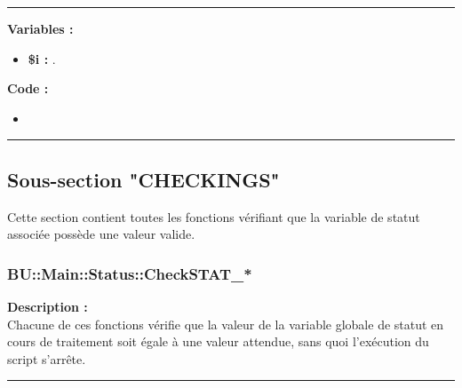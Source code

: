\documentclass[a4paper,10pt]{article}
\begin{document}
\par\noindent\rule{\textwidth}{0.4pt}

\begin{justify}\setlength{\parskip}{1em}
    \textbf{Variables :}

    \begin{itemize}
        \item \textbf{\color{orange}\$i\color{white} :} .
    \end{itemize}
\end{justify}

\begin{justify}
    \textbf{Code :}
    \begin{itemize}
        \item 
    \end{itemize}

\end{justify}



\color{green}\par\noindent\rule{\textwidth}{0.4pt}\color{white}

\color{green}
\subsection{Sous-section "CHECKINGS"}\color{white}

\begin{justify}
    Cette section contient toutes les fonctions vérifiant que la variable de statut associée possède une valeur valide.
\end{justify}

\color{blue}
\subsubsection{BU::Main::Status::CheckSTAT\_*}\color{white}

\begin{justify}
    \textbf{Description :}\\[1\baselineskip]
    Chacune de ces fonctions vérifie que la valeur de la variable globale de statut en cours de traitement soit égale à une valeur attendue, sans quoi l'exécution du script s'arrête.
\end{justify}\setlength{\parskip}{1em}


\par\noindent\rule{\textwidth}{0.4pt}
\end{document}
